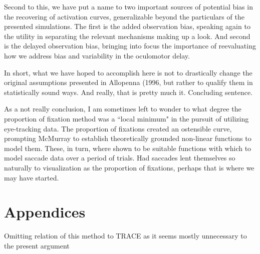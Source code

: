 \documentclass{article}
\begin{document}
Second to this, we have put a name to two important sources of potential bias in the recovering of activation curves, generalizable beyond the particulars of the presented simulations. The first is the added observation bias, speaking again to the utility in separating the relevant mechanisms making up a look. And second is the delayed observation bias, bringing into focus the importance of reevaluating how we address bias and variability in the oculomotor delay.


In short, what we have hoped to accomplish here is not to drastically change the original assumptions presented in Allopenna (1996, but rather to qualify them in statistically sound ways. And really, that is pretty much it. Concluding sentence.


As a not really conclusion, I am sometimes left to wonder to what degree the proportion of fixation method was a  ``local minimum" in the pursuit of utilizing eye-tracking data. The proportion of fixations created an ostensible curve, prompting McMurray to establish theoretically grounded non-linear functions to model them. These, in turn, where shown to be suitable functions with which to model saccade data over a period of trials. Had saccades lent themselves so naturally to visualization as the proportion of fixations, perhaps that is where we may have started.


\section{Appendices}

Omitting relation of this method to TRACE as it seems mostly unnecessary to the present argument 


%



%
\end{document}
